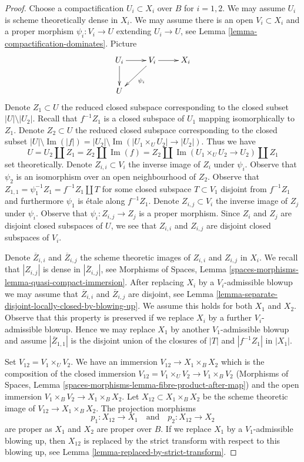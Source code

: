\documentclass{stacks-project}
\theoremstyle{plain}
\theoremstyle{definition}
\theoremstyle{remark}
\numberwithin{equation}{subsection}
\def\Im{\mathop{\mathrm{Im}}}
\begin{document}
\begin{proof}
Choose a compactification $U_i \subset X_i$ over $B$ for $i = 1, 2$. We may
assume $U_i$ is scheme theoretically dense in $X_i$. We may assume there
is an open $V_i \subset X_i$ and a proper morphism
$\psi_i : V_i \to U$ extending $U_i \to U$, see
Lemma \ref{lemma-compactification-dominates}. Picture
$$
\xymatrix{
U_i \ar[r] \ar[d] & V_i \ar[r] \ar[dl]^{\psi_i} & X_i \\
U
}
$$
Denote $Z_1 \subset U$ the reduced closed subspace corresponding
to the closed subset $|U| \setminus |U_2|$. Recall that $f^{-1}Z_1$
is a closed subspace of $U_1$ mapping isomorphically to $Z_1$.
Denote $Z_2 \subset U$ the reduced closed subspace corresponding
to the closed subset $|U| \setminus \Im(|f|) =
|U_2| \setminus \Im(|U_1 \times_U U_2| \to |U_2|)$.
Thus we have
$$
U = U_2 \amalg Z_1 = Z_2 \amalg \Im(f) =
Z_2 \amalg \Im(U_1 \times_U U_2 \to U_2) \amalg Z_1
$$
set theoretically. Denote $Z_{i, i} \subset V_i$ the inverse image of $Z_i$
under $\psi_i$. Observe that $\psi_2$ is an isomorphism over an open
neighbourhood of $Z_2$. Observe that
$Z_{1, 1} = \psi_1^{-1}Z_1 = f^{-1}Z_1 \amalg T$ for some
closed subspace $T \subset V_1$ disjoint from $f^{-1}Z_1$ and furthermore
$\psi_1$ is \'etale along $f^{-1}Z_1$.
Denote $Z_{i, j} \subset V_i$ the inverse image of $Z_j$ under $\psi_i$.
Observe that $\psi_i : Z_{i, j} \to Z_j$ is a proper morphism.
Since $Z_i$ and $Z_j$ are disjoint closed subspaces of $U$, we see that
$Z_{i, i}$ and $Z_{i, j}$ are disjoint closed subspaces of $V_i$.

\medskip\noindent
Denote $\overline{Z}_{i, i}$ and $\overline{Z}_{i, j}$ the
scheme theoretic images of $Z_{i, i}$ and $Z_{i, j}$ in $X_i$.
We recall that $|Z_{i, j}|$ is dense in $|\overline{Z}_{i, j}|$, see
Morphisms of Spaces, Lemma
\ref{spaces-morphisms-lemma-quasi-compact-immersion}.
After replacing $X_i$ by a $V_i$-admissible blowup we may assume that
$\overline{Z}_{i, i}$ and $\overline{Z}_{i, j}$ are disjoint, see
Lemma \ref{lemma-separate-disjoint-locally-closed-by-blowing-up}.
We assume this holds for both $X_1$ and $X_2$.
Observe that this property is preserved if we replace $X_i$
by a further $V_i$-admissible blowup. Hence we may replace $X_1$ by another
$V_1$-admissible blowup and assume $|\overline{Z}_{1, 1}|$
is the disjoint union of the closures of $|T|$ and $|f^{-1}Z_1|$ in $|X_1|$.

\medskip\noindent
Set $V_{12} = V_1 \times_U V_2$. We have an immersion
$V_{12} \to X_1 \times_B X_2$ which is the composition of the closed
immersion $V_{12} = V_1 \times_U V_2 \to V_1 \times_B V_2$
(Morphisms of Spaces, Lemma
\ref{spaces-morphisms-lemma-fibre-product-after-map})
and the open immersion $V_1 \times_B V_2 \to X_1 \times_B X_2$.
Let $X_{12} \subset X_1 \times_B X_2$ be the scheme theoretic image of
$V_{12} \to X_1 \times_B X_2$. The projection morphisms
$$
p_1 : X_{12} \to X_1
\quad\text{and}\quad
p_2 : X_{12} \to X_2
$$
are proper as $X_1$ and $X_2$ are proper over $B$. If we replace $X_1$ by a
$V_1$-admissible blowing up, then $X_{12}$ is replaced by
the strict transform with respect to this blowing up, see
Lemma \ref{lemma-replaced-by-strict-transform}.


\end{proof}
\end{document}
